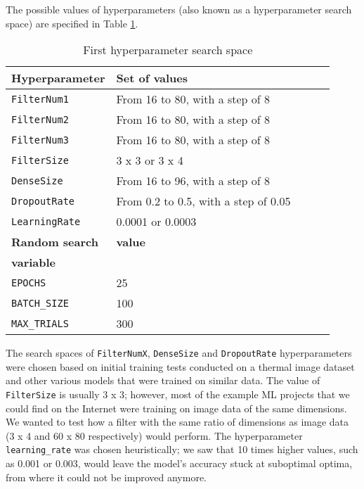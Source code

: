 The possible values of hyperparameters (also known as a hyperparameter search space) are specified in Table \ref{hyper_table1}.
\newline
\begin{table}[ht]
    \centering
    \caption{ First hyperparameter search space}
    \begin{tabular}{@{} *5l @{}}    \toprule
        \textbf{Hyperparameter} & \textbf{Set of values}\\\midrule
        \verb|FilterNum1|       & From 16 to 80, with a step of 8\\ 
        \verb|FilterNum2|       & From 16 to 80, with a step of 8\\ 
        \verb|FilterNum3|       & From 16 to 80, with a step of 8\\
        \verb|FilterSize|       & 3 x 3 or 3 x 4\\
        \verb|DenseSize|        & From 16 to 96, with a step of 8\\
        \verb|DropoutRate|      & From 0.2 to 0.5, with a step of 0.05\\
        \verb|LearningRate|     & 0.0001 or 0.0003\\\toprule
        \textbf{Random search}  & \textbf{value}\\
        \textbf{variable}       & \\\midrule
        \verb|EPOCHS|           & 25\\
        \verb|BATCH_SIZE|       & 100\\
        \verb|MAX_TRIALS|       & 300\\\bottomrule
    \end{tabular}
    \label{hyper_table1}
\end{table}

The search spaces of \verb|FilterNumX|, \verb|DenseSize| and \verb|DropoutRate| hyperparameters were chosen based on initial training tests conducted on a thermal image dataset and other various models that were trained on similar data.
The value of \verb|FilterSize| is usually 3 x 3; however, most of the example ML projects that we could find on the Internet were training on image data of the same dimensions.
We wanted to test how a filter with the same ratio of dimensions as image data (3 x 4 and 60 x 80 respectively) would perform.
The hyperparameter \verb|learning_rate| was chosen heuristically; we saw that 10 times higher values, such as 0.001 or 0.003, would leave the model's accuracy stuck at suboptimal optima, from where it could not be improved anymore.

